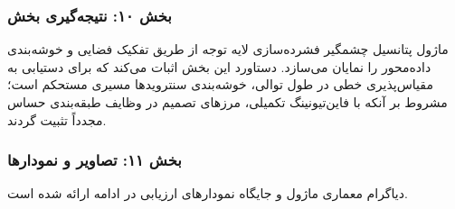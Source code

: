 \subsubsection*{بخش ۱۰: نتیجه‌گیری بخش }
ماژول  پتانسیل چشمگیر فشرده‌سازی لایه توجه از طریق تفکیک فضایی و خوشه‌بندی داده‌محور را نمایان می‌سازد. دستاورد این بخش اثبات می‌کند که برای دستیابی به مقیاس‌پذیری خطی در طول توالی، خوشه‌بندی سنترویدها مسیری مستحکم است؛ مشروط بر آنکه با فاین‌تیونینگ تکمیلی، مرزهای تصمیم در وظایف طبقه‌بندی حساس مجدداً تثبیت گردند.

\subsubsection*{بخش ۱۱: تصاویر و نمودارها }
دیاگرام معماری ماژول و جایگاه نمودارهای ارزیابی در ادامه ارائه شده است.
